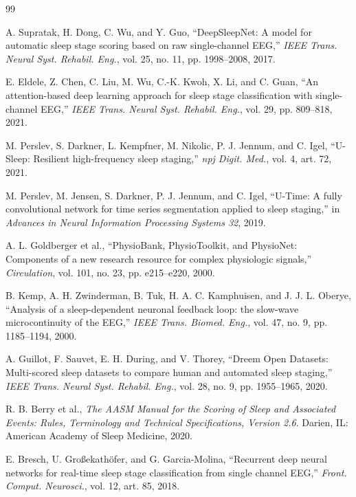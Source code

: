 \documentclass[conference]{IEEEtran}
\begin{document}
\begin{thebibliography}{99}

 A. Supratak, H. Dong, C. Wu, and Y. Guo, ``DeepSleepNet: A model for
automatic sleep stage scoring based on raw single-channel EEG,'' \emph{IEEE Trans. Neural Syst.
Rehabil. Eng.}, vol. 25, no. 11, pp. 1998--2008, 2017.

 E. Eldele, Z. Chen, C. Liu, M. Wu, C.-K. Kwoh, X. Li, and C. Guan, ``An
attention-based deep learning approach for sleep stage classification with single-channel EEG,''
\emph{IEEE Trans. Neural Syst. Rehabil. Eng.}, vol. 29, pp. 809--818, 2021.

 M. Perslev, S. Darkner, L. Kempfner, M. Nikolic, P. J. Jennum, and C. Igel,
``U-Sleep: Resilient high-frequency sleep staging,'' \emph{npj Digit. Med.}, vol. 4, art. 72, 2021.

 M. Perslev, M. Jensen, S. Darkner, P. J. Jennum, and C. Igel, ``U-Time: A fully
convolutional network for time series segmentation applied to sleep staging,'' in \emph{Advances in
Neural Information Processing Systems 32}, 2019.

 A. L. Goldberger et al., ``PhysioBank, PhysioToolkit, and PhysioNet: Components
of a new research resource for complex physiologic signals,'' \emph{Circulation}, vol. 101, no. 23,
pp. e215--e220, 2000.

 B. Kemp, A. H. Zwinderman, B. Tuk, H. A. C. Kamphuisen, and J. J. L. Oberye,
``Analysis of a sleep-dependent neuronal feedback loop: the slow-wave microcontinuity of the EEG,''
\emph{IEEE Trans. Biomed. Eng.}, vol. 47, no. 9, pp. 1185--1194, 2000.

 A. Guillot, F. Sauvet, E. H. During, and V. Thorey, ``Dreem Open Datasets:
Multi-scored sleep datasets to compare human and automated sleep staging,'' \emph{IEEE Trans.
Neural Syst. Rehabil. Eng.}, vol. 28, no. 9, pp. 1955--1965, 2020.

 R. B. Berry et al., \emph{The AASM Manual for the Scoring of Sleep and Associated
Events: Rules, Terminology and Technical Specifications, Version 2.6}. Darien, IL: American Academy
of Sleep Medicine, 2020.

 E. Bresch, U. Gro\ss{}ekath\"ofer, and G. Garcia-Molina, ``Recurrent deep neural
networks for real-time sleep stage classification from single channel EEG,'' \emph{Front. Comput.
Neurosci.}, vol. 12, art. 85, 2018.


\end{thebibliography}
\end{document}
